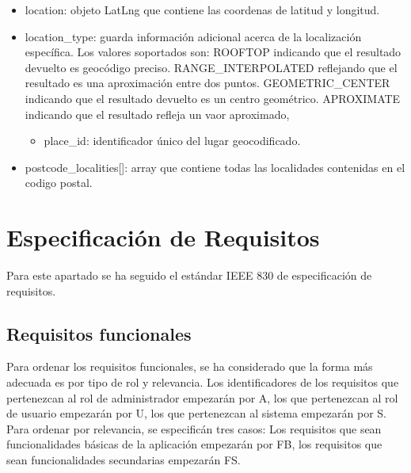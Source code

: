 \begin{itemize}

\item location: objeto LatLng que contiene las coordenas de latitud y longitud.

\item location\_type: guarda información adicional acerca de la localización específica. Los valores soportados son: ROOFTOP indicando que el resultado devuelto es geocódigo preciso. RANGE\_INTERPOLATED reflejando que el resultado es una aproximación entre dos puntos. GEOMETRIC\_CENTER indicando que el resultado devuelto es un centro geométrico. APROXIMATE indicando que el resultado refleja un vaor aproximado,

\begin{itemize}

\item place\_id: identificador único del lugar geocodificado.


\end{itemize}

\item postcode\_localities[]: array que contiene todas las localidades contenidas en el codigo postal.

\end{itemize}

\section{Especificación de Requisitos}

Para este apartado se ha seguido el estándar IEEE 830 de especificación de requisitos.

\subsection{Requisitos funcionales}

Para ordenar los requisitos funcionales, se ha considerado que la forma más adecuada es por tipo de rol y relevancia. Los identificadores de los requisitos que pertenezcan al rol de administrador empezarán por A, los que pertenezcan al rol de usuario empezarán por U, los que pertenezcan al sistema empezarán por S. Para ordenar por relevancia, se especificán tres casos: Los requisitos que sean funcionalidades básicas de la aplicación empezarán por FB, los requisitos que sean funcionalidades secundarias empezarán FS.

\vspace{5 mm}


